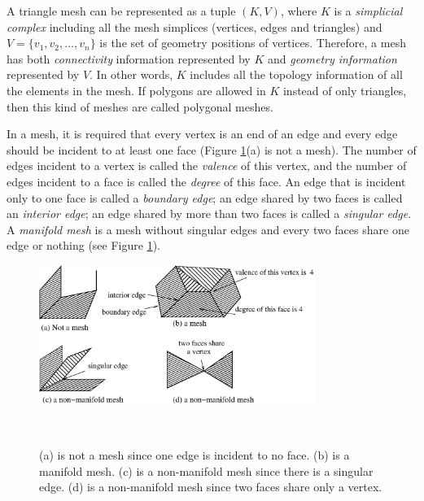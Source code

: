     A triangle mesh can be represented as a tuple $(K, V)$, where $K$ is a
    \emph{simplicial complex} including all the mesh simplices 
    (vertices, edges and triangles) and $V =\{v_{1}, v_{2}, ...,
    v_{n}\}$ is the set of geometry positions of vertices. Therefore,
    a mesh has both \emph{connectivity} information represented by $K$
    and \emph{geometry information} represented by $V$. In other
    words, $K$ includes all the topology information of all the
    elements in the mesh. If
    polygons are allowed in $K$ instead of only triangles, then this
    kind of meshes are called polygonal meshes.

    In a mesh, it is required that every
    vertex is an end of an edge and every edge should be incident to at
    least one face (Figure \ref{mesh_non_mesh}(a) is not a mesh).
    The number of edges incident to a vertex is called the
    \emph{valence} of this vertex, and the number of edges incident to
    a face is called the \emph{degree} of this face. An edge that is 
    incident only to one face is called a \emph{boundary edge}; an edge
    shared by two faces is called an \emph{interior edge}; an edge
    shared by more than two faces is called a \emph{singular edge}. A
    \emph{manifold mesh} is a mesh without singular edges and every
    two faces share one edge or nothing (see Figure \ref{mesh_non_mesh}).
\begin{figure}
\centering
\includegraphics[width=0.8\textwidth]{figure2.1.eps}
\caption[Manifold mesh, non-manifold mesh and non-mesh]{ (a) is not
a mesh since one edge is incident to no face. (b) is a manifold
mesh. (c) is a non-manifold mesh since there is a singular edge.
(d) is a non-manifold mesh since two faces share only a
vertex.\label{mesh_non_mesh}}\
\end{figure}

